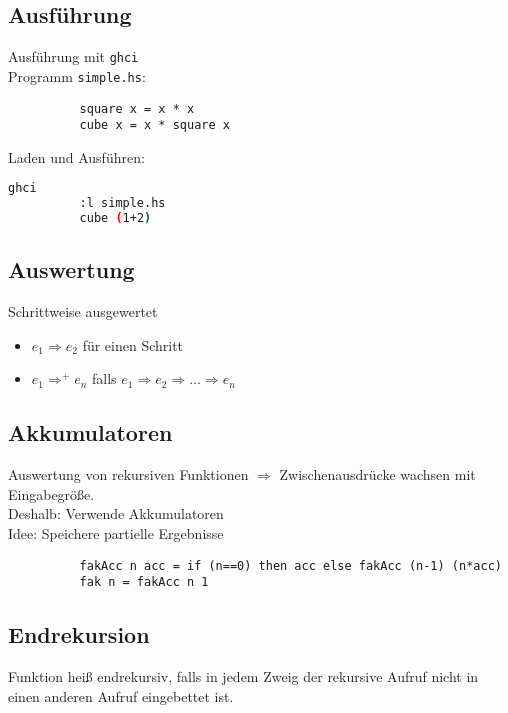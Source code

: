\documentclass[10pt,a4paper]{article}
\def\code#1{\texttt{#1}}
\begin{document}
        \subsection{Ausführung}
        Ausführung mit \code{ghci}\\
        Programm \code{simple.hs}:
        \begin{lstlisting}
          square x = x * x
          cube x = x * square x
        \end{lstlisting}
        Laden und Ausführen:
        \begin{lstlisting}[language=bash]
          ghci
          :l simple.hs
          cube (1+2)
        \end{lstlisting}

        \subsection{Auswertung}
        Schrittweise ausgewertet
        \begin{itemize}
          \item \(e_1 \Rightarrow e_2\) für einen Schritt
          \item \(e_1 \Rightarrow^+ e_n \) falls \(e_1 \Rightarrow e_2 \Rightarrow ... \Rightarrow e_n\)
        \end{itemize}
        
        \subsection{Akkumulatoren}
        Auswertung von rekursiven Funktionen \(\Rightarrow\) Zwischenausdrücke wachsen mit Eingabegröße.\\
        Deshalb: Verwende Akkumulatoren\\
        Idee: Speichere partielle Ergebnisse
        \begin{lstlisting}
          fakAcc n acc = if (n==0) then acc else fakAcc (n-1) (n*acc)
          fak n = fakAcc n 1
        \end{lstlisting}

        \subsection{Endrekursion}
        Funktion heiß endrekursiv, falls in jedem Zweig der rekursive Aufruf nicht in einen anderen Aufruf eingebettet ist.
\end{document}
